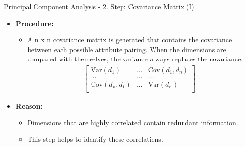 \begin{frame}{Principal Component Analysis - 2. Step: Covariance Matrix (I)}
	\begin{itemize}
		\item \textbf{Procedure:}
		      \begin{itemize}
			      \item A n x n covariance matrix is generated that contains the
			            covariance between each possible attribute pairing. When the
			            dimensions are compared with themselves, the variance always
			            replaces the covariance:
			            \begin{align}
				            \begin{bmatrix}
					            \text{Var}(d_1)      & ... & \text{Cov}(d_1, d_n) \\
					            ...                  & ... & ...                  \\
					            \text{Cov}(d_n, d_1) & ... & \text{Var}(d_n)      \\
				            \end{bmatrix}
			            \end{align}
		      \end{itemize}
		\item \textbf{Reason:}
		      \begin{itemize}
			      \item Dimensions that are highly correlated contain redundant
			            information.
			      \item This step helps to identify these correlations.
		      \end{itemize}
	\end{itemize}
\end{frame}

